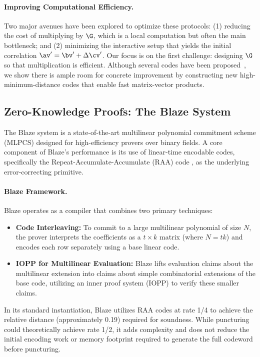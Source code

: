 \paragraph{Improving Computational Efficiency.}
Two major avenues have been explored to optimize these protocols:  
(1) reducing the cost of multiplying by $\G$, which is a local computation but often the main bottleneck; and  
(2) minimizing the interactive setup that yields the initial correlation $\av' = \bv' + \Delta \cv'$.
Our focus is on the first challenge: designing $\G$ so that
multiplication is efficient. Although several codes have been proposed~\cite{silentOTCCS,silver,EA,EC}, we show there is ample room for concrete improvement by constructing new high-minimum-distance codes that enable fast matrix-vector products.


\subsection{Zero-Knowledge Proofs: The Blaze System}

The Blaze system \cite{blaze} is a state-of-the-art multilinear polynomial commitment scheme (MLPCS) designed for high-efficiency provers over binary fields. A core component of Blaze's performance is its use of linear-time encodable codes, specifically the Repeat-Accumulate-Accumulate (RAA) code \cite{ra,kahale1998minimum}, as the underlying error-correcting primitive. 

\paragraph{Blaze Framework.}
Blaze operates as a compiler that combines two primary techniques:
\begin{itemize}
    \item {\bf Code Interleaving:} To commit to a large multilinear polynomial of size $N$, the prover interprets the coefficients as a $t \times k$ matrix (where $N = tk$) and encodes each row separately using a base linear code.

    \item {\bf IOPP for Multilinear Evaluation:} Blaze lifts evaluation claims about the multilinear extension into claims about simple combinatorial extensions of the base code, utilizing an inner proof system (IOPP) to verify these smaller claims.
\end{itemize}
 
 In its standard instantiation, Blaze utilizes RAA codes at rate 1/4 to achieve the relative distance (approximately 0.19) required for soundness. While puncturing could theoretically achieve rate 1/2, it adds complexity and does not reduce the initial encoding work or memory footprint required to generate the full codeword before puncturing.
 
